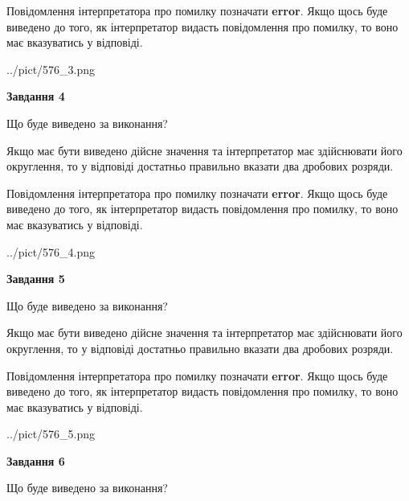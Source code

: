 \documentclass[12pt, ukrainian]{article}
\begin{document}
{\begin {Large}
Повідомлення інтерпретатора про помилку позначати \textbf{error}.
Якщо щось буде виведено до того, як інтерпретатор видасть повідомлення про помилку, 
то воно має вказуватись у відповіді. \par

\begin{center}
	{../pict/576_3.png}
\end{center}
\newpage

{\begin {center}\textbf{Завдання 4}\end {center}}\par
Що буде виведено за виконання? \par

Якщо має бути виведено дійсне значення та інтерпретатор має здійснювати його округлення, 
то у відповіді достатньо правильно вказати два дробових розряди.

Повідомлення інтерпретатора про помилку позначати \textbf{error}.
Якщо щось буде виведено до того, як інтерпретатор видасть повідомлення про помилку, 
то воно має вказуватись у відповіді. \par

\begin{center}
	{../pict/576_4.png}
\end{center}
\newpage

{\begin {center}\textbf{Завдання 5}\end {center}}\par
Що буде виведено за виконання? \par

Якщо має бути виведено дійсне значення та інтерпретатор має здійснювати його округлення, 
то у відповіді достатньо правильно вказати два дробових розряди.

Повідомлення інтерпретатора про помилку позначати \textbf{error}.
Якщо щось буде виведено до того, як інтерпретатор видасть повідомлення про помилку, 
то воно має вказуватись у відповіді. \par

\begin{center}
	{../pict/576_5.png}
\end{center}
\newpage

{\begin {center}\textbf{Завдання 6}\end {center}}\par
Що буде виведено за виконання? \par


\end{Large}}
\end{document}
